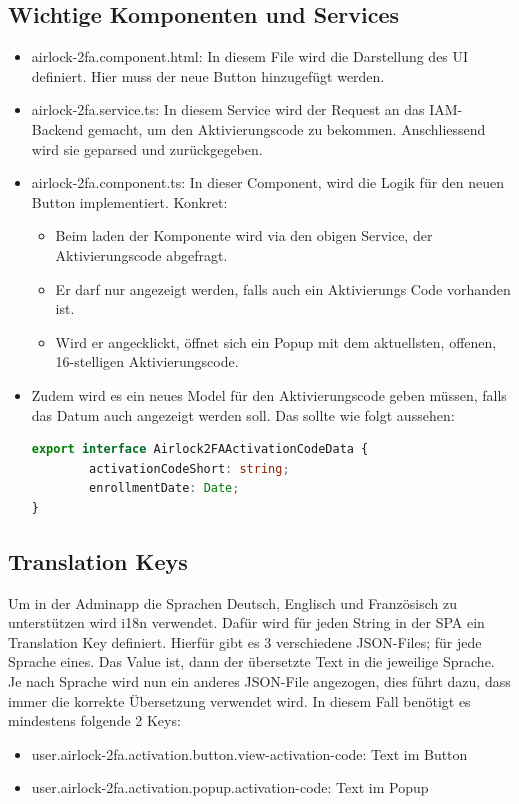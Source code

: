 \subsection{Wichtige Komponenten und Services}
\begin{itemize}
	\item airlock-2fa.component.html: In diesem File wird die Darstellung des UI definiert. Hier muss der neue Button hinzugefügt werden.
	\item airlock-2fa.service.ts: In diesem Service wird der Request an das IAM-Backend gemacht, um den Aktivierungscode zu bekommen. Anschliessend wird sie geparsed und zurückgegeben.
	\item airlock-2fa.component.ts: In dieser Component, wird die Logik für den neuen Button implementiert. Konkret:
	\begin{itemize}
		\item Beim laden der Komponente wird via den obigen Service, der Aktivierungscode abgefragt.  
		\item Er darf nur angezeigt werden, falls auch ein Aktivierungs Code vorhanden ist.
		\item Wird er angecklickt, öffnet sich ein Popup mit dem aktuellsten, offenen, 16-stelligen Aktivierungscode.
	\end{itemize}
	\item Zudem wird es ein neues Model für den Aktivierungscode geben müssen, falls das Datum auch angezeigt werden soll. Das sollte wie folgt aussehen:
		\begin{lstlisting}[language=TypeScript]
export interface Airlock2FAActivationCodeData {
		activationCodeShort: string;
		enrollmentDate: Date;
}
		\end{lstlisting}
\end{itemize}
\subsection{Translation Keys}
Um in der Adminapp die Sprachen Deutsch, Englisch und Französisch zu unterstützen wird i18n verwendet. Dafür wird für jeden String in der SPA ein Translation Key definiert. Hierfür gibt es 3 verschiedene JSON-Files; für jede Sprache eines. Das Value ist, dann der übersetzte Text in die jeweilige Sprache. Je nach Sprache wird nun ein anderes JSON-File angezogen, dies führt dazu, dass immer die korrekte Übersetzung verwendet wird. In diesem Fall benötigt es mindestens folgende 2 Keys:
\begin{itemize}
	\item user.airlock-2fa.activation.button.view-activation-code: Text im Button
	\item user.airlock-2fa.activation.popup.activation-code: Text im Popup
\end{itemize}

